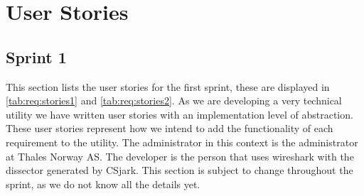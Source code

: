 \section{User Stories}
\label{sec:req:stories}
\subsection{Sprint 1}
\label{sec:req:stories1}
This section lists the user stories for the first sprint, these are displayed in \autoref{tab:req:stories1} and \autoref{tab:req:stories2}.
As we are developing a very technical \gls{utility} we have written user stories with an implementation level of abstraction. 
These user stories represent how we intend to add the functionality of each requirement to the \gls{utility}.
The administrator in this context is the administrator at Thales Norway AS. 
The developer is the person that uses \Gls{wireshark} with the \gls{dissector} generated by CSjark.
This section is subject to change throughout the sprint, as we do not know all the details yet.

